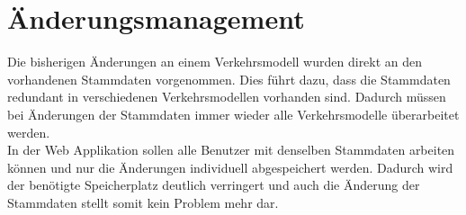 \section{Änderungsmanagement}
Die bisherigen Änderungen an einem Verkehrsmodell wurden direkt an den vorhandenen Stammdaten vorgenommen. Dies führt dazu, dass die Stammdaten redundant in verschiedenen Verkehrsmodellen vorhanden sind. Dadurch müssen bei Änderungen der Stammdaten immer wieder alle Verkehrsmodelle überarbeitet werden.\\
In der Web Applikation sollen alle Benutzer mit denselben Stammdaten arbeiten können und nur die Änderungen individuell abgespeichert werden. Dadurch wird der benötigte Speicherplatz deutlich verringert und auch die Änderung der Stammdaten stellt somit kein Problem mehr dar.\\